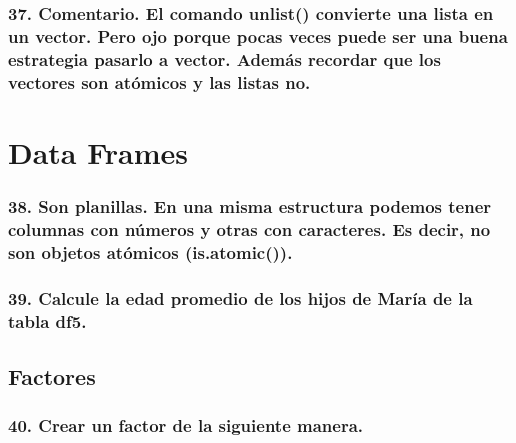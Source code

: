 \documentclass[
]{article}
\begin{document}
\hypertarget{comentario.-el-comando-unlist-convierte-una-lista-en-un-vector.-pero-ojo-porque-pocas-veces-puede-ser-una-buena-estrategia-pasarlo-a-vector.-ademuxe1s-recordar-que-los-vectores-son-atuxf3micos-y-las-listas-no.}{%
\subsubsection{37. Comentario. El comando unlist() convierte una lista
en un vector. Pero ojo porque pocas veces puede ser una buena estrategia
pasarlo a vector. Además recordar que los vectores son atómicos y las
listas
no.}\label{comentario.-el-comando-unlist-convierte-una-lista-en-un-vector.-pero-ojo-porque-pocas-veces-puede-ser-una-buena-estrategia-pasarlo-a-vector.-ademuxe1s-recordar-que-los-vectores-son-atuxf3micos-y-las-listas-no.}}

\hypertarget{data-frames}{%
\section{\texorpdfstring{\textbf{Data
Frames}}{Data Frames}}\label{data-frames}}

\hypertarget{son-planillas.-en-una-misma-estructura-podemos-tener-columnas-con-nuxfameros-y-otras-con-caracteres.-es-decir-no-son-objetos-atuxf3micos-is.atomic.}{%
\subsubsection{38. Son planillas. En una misma estructura podemos tener
columnas con números y otras con caracteres. Es decir, no son objetos
atómicos
(is.atomic()).}\label{son-planillas.-en-una-misma-estructura-podemos-tener-columnas-con-nuxfameros-y-otras-con-caracteres.-es-decir-no-son-objetos-atuxf3micos-is.atomic.}}

\hypertarget{calcule-la-edad-promedio-de-los-hijos-de-maruxeda-de-la-tabla-df5.}{%
\subsubsection{39. Calcule la edad promedio de los hijos de María de la
tabla
df5.}\label{calcule-la-edad-promedio-de-los-hijos-de-maruxeda-de-la-tabla-df5.}}

\hypertarget{factores}{%
\subsection{Factores}\label{factores}}

\hypertarget{crear-un-factor-de-la-siguiente-manera.}{%
\subsubsection{40. Crear un factor de la siguiente
manera.}\label{crear-un-factor-de-la-siguiente-manera.}}
\end{document}
